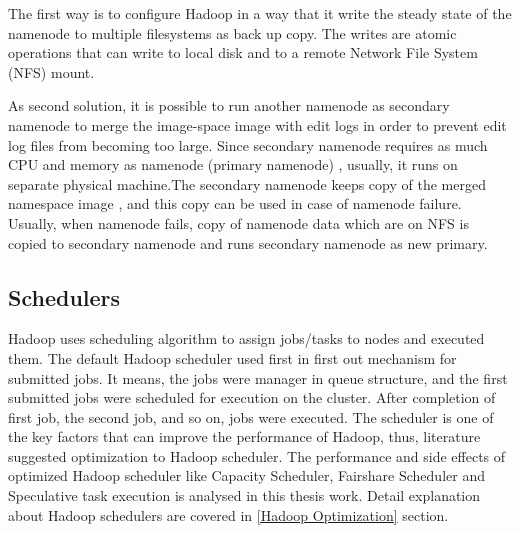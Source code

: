 The first way is to configure Hadoop in a way that it write the steady state of the namenode to multiple filesystems as back up copy. The writes are atomic operations that can write to local disk and to a remote Network File System (NFS) mount.


As second solution, it is possible to run another namenode as secondary namenode to merge the image-space image with edit logs in order to prevent edit log files from becoming too large. Since secondary namenode requires as much CPU and memory as namenode (primary namenode) , usually, it runs on separate physical machine.The secondary namenode keeps copy of the merged namespace image , and this copy can be used in case of namenode failure. Usually, when namenode fails, copy of namenode data which are on NFS is copied to secondary namenode and runs secondary namenode as new primary.


   




\subsection{Schedulers}

Hadoop uses scheduling algorithm to assign jobs/tasks to nodes and executed them. The default Hadoop scheduler  used first in first out mechanism for submitted jobs. It means, the jobs were manager in queue structure,  and the first submitted jobs were scheduled for execution on the cluster. After completion of first job, the second job, and so on, jobs were executed. The scheduler is one of the key factors that can improve the performance of Hadoop, thus, literature suggested optimization to Hadoop scheduler. The performance and side effects of optimized Hadoop scheduler like Capacity Scheduler, Fairshare Scheduler and Speculative task execution is analysed in this thesis work. Detail explanation about Hadoop schedulers are covered in \ref{Hadoop Optimization} section. 



 



